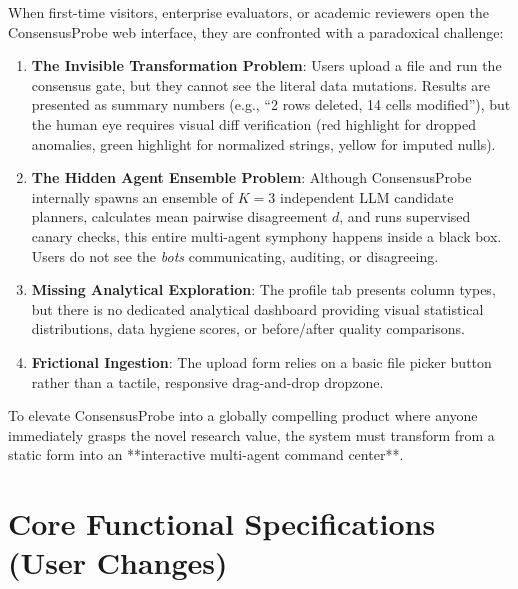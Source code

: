 \documentclass[11pt,a4paper]{article}
\begin{document}
When first-time visitors, enterprise evaluators, or academic reviewers open the ConsensusProbe web interface, they are confronted with a paradoxical challenge:
\begin{enumerate}[leftmargin=*]
    \item \textbf{The Invisible Transformation Problem}: Users upload a file and run the consensus gate, but they cannot see the literal data mutations. Results are presented as summary numbers (e.g., ``2 rows deleted, 14 cells modified''), but the human eye requires visual diff verification (red highlight for dropped anomalies, green highlight for normalized strings, yellow for imputed nulls).
    \item \textbf{The Hidden Agent Ensemble Problem}: Although ConsensusProbe internally spawns an ensemble of $K=3$ independent LLM candidate planners, calculates mean pairwise disagreement $d$, and runs supervised canary checks, this entire multi-agent symphony happens inside a black box. Users do not see the \textit{bots} communicating, auditing, or disagreeing.
    \item \textbf{Missing Analytical Exploration}: The profile tab presents column types, but there is no dedicated analytical dashboard providing visual statistical distributions, data hygiene scores, or before/after quality comparisons.
    \item \textbf{Frictional Ingestion}: The upload form relies on a basic file picker button rather than a tactile, responsive drag-and-drop dropzone.
\end{enumerate}

To elevate ConsensusProbe into a globally compelling product where anyone immediately grasps the novel research value, the system must transform from a static form into an **interactive multi-agent command center**.

\section{Core Functional Specifications (User Changes)}
\label{sec:changes}
\end{document}
